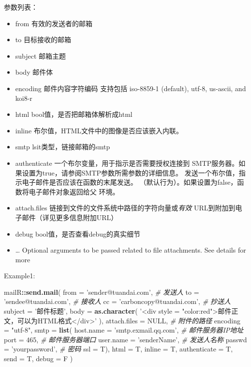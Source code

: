 \documentclass[]{book}
\newenvironment{Shaded}{\begin{snugshade}}{\end{snugshade}}
\newcommand{\KeywordTok}[1]{\textcolor[rgb]{0.13,0.29,0.53}{\textbf{#1}}}
\newcommand{\DataTypeTok}[1]{\textcolor[rgb]{0.13,0.29,0.53}{#1}}
\newcommand{\DecValTok}[1]{\textcolor[rgb]{0.00,0.00,0.81}{#1}}
\newcommand{\StringTok}[1]{\textcolor[rgb]{0.31,0.60,0.02}{#1}}
\newcommand{\CommentTok}[1]{\textcolor[rgb]{0.56,0.35,0.01}{\textit{#1}}}
\newcommand{\OtherTok}[1]{\textcolor[rgb]{0.56,0.35,0.01}{#1}}
\newcommand{\OperatorTok}[1]{\textcolor[rgb]{0.81,0.36,0.00}{\textbf{#1}}}
\newcommand{\NormalTok}[1]{#1}
\begin{document}
参数列表：

\begin{itemize}
\item
  from 有效的发送者的邮箱
\item
  to 目标接收的邮箱
\item
  subject 邮箱主题
\item
  body 邮件体
\item
  encoding 邮件内容字符编码 支持包括 iso-8859-1 (default), utf-8,
  us-ascii, and koi8-r
\item
  html bool值，是否把邮箱体解析成html
\item
  inline 布尔值，HTML文件中的图像是否应该嵌入内联。
\item
  smtp lsit类型，链接邮箱的smtp
\item
  authenticate 一个布尔变量，用于指示是否需要授权连接到
  SMTP服务器。如果设置为true，请参阅SMTP参数所需参数的详细信息。
  发送一个布尔值，指示电子邮件是否应该在函数的末尾发送。
  （默认行为）。如果设置为false，函数将电子邮件对象返回给父 环境。
\item
  attach.files 链接到文件的文件系统中路径的字符向量或\emph{有效}
  URL到附加到电子邮件（详见更多信息附加URL）
\item
  debug bool值，是否查看debug的真实细节
\item
  \ldots{} Optional arguments to be passed related to file attachments.
  See details for more
\end{itemize}

Example1:

\begin{Shaded}
\begin{Highlighting}[]
\NormalTok{mailR}\OperatorTok{::}\KeywordTok{send.mail}\NormalTok{(}
  \DataTypeTok{from =} \StringTok{'sender@tuandai.com'}\NormalTok{, }\CommentTok{# 发送人}
  \DataTypeTok{to =} \StringTok{'sendee@tuandai.com'}\NormalTok{, }\CommentTok{# 接收人}
  \DataTypeTok{cc =} \StringTok{'carboncopy@tuandai.com'}\NormalTok{, }\CommentTok{# 抄送人}
  \DataTypeTok{subject =} \StringTok{'邮件标题'}\NormalTok{,}
  \DataTypeTok{body =} \KeywordTok{as.character}\NormalTok{(}
    \StringTok{'<div style = "color:red">邮件正文，可以为HTML格式</div>'}
\NormalTok{  ),}
  \DataTypeTok{attach.files =} \OtherTok{NULL}\NormalTok{, }\CommentTok{# 附件的路径}
  \DataTypeTok{encoding =} \StringTok{"utf-8"}\NormalTok{,}
  \DataTypeTok{smtp =} \KeywordTok{list}\NormalTok{(}
    \DataTypeTok{host.name =} \StringTok{'smtp.exmail.qq.com'}\NormalTok{, }\CommentTok{# 邮件服务器IP地址}
    \DataTypeTok{port =} \DecValTok{465}\NormalTok{, }\CommentTok{# 邮件服务器端口}
    \DataTypeTok{user.name =} \StringTok{'senderName'}\NormalTok{, }\CommentTok{# 发送人名称}
    \DataTypeTok{passwd =} \StringTok{'yourpassword'}\NormalTok{, }\CommentTok{# 密码}
    \DataTypeTok{ssl =}\NormalTok{ T),}
  \DataTypeTok{html =}\NormalTok{ T, }\DataTypeTok{inline =}\NormalTok{ T, }\DataTypeTok{authenticate =}\NormalTok{ T, }\DataTypeTok{send =}\NormalTok{ T, }\DataTypeTok{debug =}\NormalTok{ F}
\NormalTok{)}
\end{Highlighting}
\end{Shaded}
\end{document}
